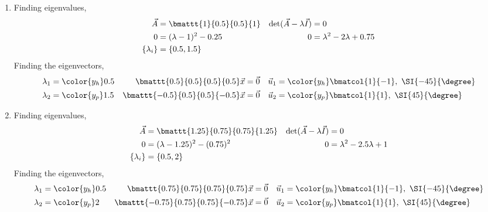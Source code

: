 \begin{enumerate}
    \item Finding eigenvalues,
          \begin{align}
              \vec{A}                        & = \bmattt{1}{0.5}{0.5}{1}      &
              \det(\vec{A} - \lambda\vec{I}) & = 0                              \\
              0                              & = (\lambda - 1)^2 - 0.25       &
              0                              & = \lambda^2 - 2 \lambda + 0.75   \\
              \{\lambda_i\}                  & = \{ 0.5, 1.5 \}
          \end{align}
          Finding the eigenvectors,
          \begin{align}
              \lambda_1                             & = \color{y_h} 0.5 &
              \bmattt{0.5}{0.5}{0.5}{0.5} \vec{x}   & = \vec{0}         &
              \vec{u}_1                             & = \color{y_h}
              \bmatcol{1}{-1},\ \SI{-45}{\degree}                         \\
              \lambda_2                             & = \color{y_p} 1.5 &
              \bmattt{-0.5}{0.5}{0.5}{-0.5} \vec{x} & = \vec{0}         &
              \vec{u}_2                             & = \color{y_p}
              \bmatcol{1}{1},\ \SI{45}{\degree}
          \end{align}

    \item Finding eigenvalues,
          \begin{align}
              \vec{A}                        & = \bmattt{1.25}{0.75}{0.75}{1.25} &
              \det(\vec{A} - \lambda\vec{I}) & = 0                                 \\
              0                              & = (\lambda - 1.25)^2 - (0.75)^2   &
              0                              & = \lambda^2 - 2.5 \lambda + 1       \\
              \{\lambda_i\}                  & = \{ 0.5, 2 \}
          \end{align}
          Finding the eigenvectors,
          \begin{align}
              \lambda_1                                 & = \color{y_h} 0.5 &
              \bmattt{0.75}{0.75}{0.75}{0.75} \vec{x}   & = \vec{0}         &
              \vec{u}_1                                 & = \color{y_h}
              \bmatcol{1}{-1},\ \SI{-45}{\degree}                             \\
              \lambda_2                                 & = \color{y_p} 2   &
              \bmattt{-0.75}{0.75}{0.75}{-0.75} \vec{x} & = \vec{0}         &
              \vec{u}_2                                 & = \color{y_p}
              \bmatcol{1}{1},\ \SI{45}{\degree}
          \end{align}


\end{enumerate}
